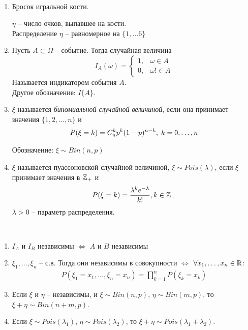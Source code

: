 \begin{example}~
	\begin{enumerate}
		\item 
			Бросок игральной кости.

			$\eta$ -- число очков, выпавшее на кости.\\
			Распределение $\eta$ -- равномерное на $\{ 1, \ldots 6 \}$\\
			
		\item 
			Пусть $A \subset \Omega$ -- событие. Тогда случайная величина
			\begin{equation*}
				I_A(\omega) =
				\begin{cases}
					1, & \omega \in A\\
					0, & \omega !\in A
				\end{cases}		
			\end{equation*}
			Называется индикатором события $A.$\\
			Другое обозначение: $I\{ A \}$.
		
		\item 
			$\xi$ называется \emph{биномиальной случайной величиной}, если
			она принимает значения $\{1, 2, \ldots, n\}$ и
			\begin{align*}
				P(\xi = k) = C_{n}^{k} p^k (1 - p)^{n - k},\; k = 0, \ldots, n
			\end{align*}

			Обозначение: $\xi \sim Bin(n, p)$
		
		\item 
			$\xi$ называется пуассоновской случайной величиной, $\xi \sim Pois(\lambda)$, 
			если $\xi$ принимает значения в $\mathbb{Z}_+$ и
			\begin{align*}
				P(\xi = k) = \frac{\lambda^k e^{-\lambda}}{k!}, k \in \mathbb{Z}_+
			\end{align*}
			$\lambda > 0$ -- параметр распределения.
	\end{enumerate}
\end{example}

\begin{exercise}~
	\begin{enumerate}
		\item $I_A$ и $I_B$ независимы $\Leftrightarrow$ $A$ и $B$ независимы
		\item 
			$\xi_1, \ldots, \xi_n$ -- с.в. Тогда они независимы в совокупности 
			$\Leftrightarrow$ $\forall x_1, \ldots, x_n \in \mathbb{R}$:
			\begin{align*}
				P(\xi_1 = x_1, \ldots, \xi_n = x_n) = \prod\limits_{k = 1}^{n} P(\xi_k = x_k)
			\end{align*}

		\item
			Если $\xi$ и $\eta$ -- независимы, и $\xi \sim Bin(n, p)$, $\eta \sim Bin(m, p)$, то
			$\xi + \eta \sim Bin(n + m, p)$.

		\item
			Если $\xi \sim Pois(\lambda_1)$, $\eta \sim Pois(\lambda_2)$, то
			$\xi + \eta \sim Pois(\lambda_1 + \lambda_2)$.

	\end{enumerate}
\end{exercise}


